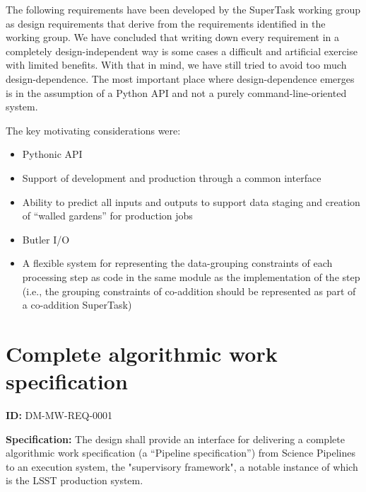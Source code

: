 \documentclass[SE,toc,lsstdraft]{lsstdoc}
\date{2017-06-29}
\begin{document}
\maketitle

The following requirements have been developed by the SuperTask working group as design requirements that derive from the requirements identified in the working group. We have concluded that writing down every requirement in a completely design-independent way is some cases a difficult and artificial exercise with limited benefits. With that in mind, we have still tried to avoid too much design-dependence. The most important place where design-dependence emerges is in the assumption of a Python API and not a purely command-line-oriented system.

The key motivating considerations were:

    \begin{itemize}
\item
Pythonic API

\item
Support of development and production through a common interface

\item
Ability to predict all inputs and outputs to support data staging and creation of “walled gardens” for production jobs

\item
Butler I/O

\item
A flexible system for representing the data-grouping constraints of each processing step as code in the same module as the implementation of the step (i.e., the grouping constraints of co-addition should be represented as part of a co-addition SuperTask)

    \end{itemize}

\section{Complete algorithmic work specification}

\label{DM-MW-REQ-0001}
\textbf{ID:} DM-MW-REQ-0001

\textbf{Specification:}
The design shall provide an interface for delivering a complete algorithmic work specification (a “Pipeline specification”) from Science Pipelines to an execution system, the "supervisory framework", a notable instance of which is the LSST production system.
\end{document}
